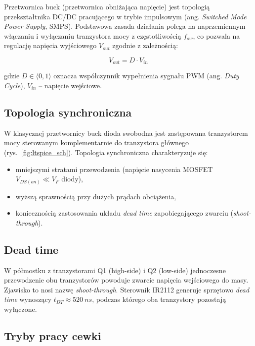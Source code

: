 \documentclass[12pt,a4paper]{article}
\begin{document}
Przetwornica buck (przetwornica obniżająca napięcie) jest topologią przekształtnika DC/DC
pracującego w trybie impulsowym (ang. \textit{Switched Mode Power Supply}, SMPS).
Podstawowa zasada działania polega na naprzemiennym włączaniu i wyłączaniu tranzystora
mocy z częstotliwością $f_{sw}$, co pozwala na regulację napięcia wyjściowego $V_{out}$
zgodnie z zależnością:

\begin{equation}
    V_{out} = D \cdot V_{in}
    \label{eq:buck_basic}
\end{equation}

\noindent gdzie $D \in \langle 0, 1 \rangle$ oznacza współczynnik wypełnienia sygnału PWM
(ang. \textit{Duty Cycle}), $V_{in}$ -- napięcie wejściowe.

\subsection{Topologia synchroniczna}

W klasycznej przetwornicy buck dioda swobodna jest zastępowana tranzystorem
mocy sterowanym komplementarnie do tranzystora głównego (rys.~\ref{fig:ltspice_sch}).
Topologia synchroniczna charakteryzuje się:

\begin{itemize}
    \item mniejszymi stratami przewodzenia (napięcie nasycenia MOSFET $V_{DS(on)} \ll V_F$ diody),
    \item wyższą sprawnością przy dużych prądach obciążenia,
    \item koniecznością zastosowania układu \textit{dead time} zapobiegającego
          zwarciu (\textit{shoot-through}).
\end{itemize}

\subsection{Dead time}

W półmostku z tranzystorami Q1 (high-side) i Q2 (low-side) jednoczesne
przewodzenie obu tranzystorów powoduje zwarcie napięcia wejściowego do masy.
Zjawisko to nosi nazwę \textit{shoot-through}. Sterownik IR2112 generuje sprzętowo
\textit{dead time} wynoszący $t_{DT} \approx \SI{520}{ns}$, podczas którego oba
tranzystory pozostają wyłączone.

\subsection{Tryby pracy cewki}
\end{document}
